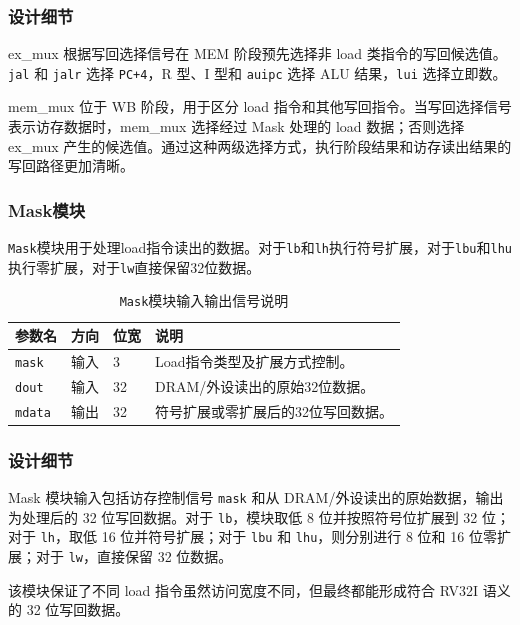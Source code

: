 \documentclass[12pt,a4paper]{ctexart}
\newcommand{\code}[1]{\texttt{#1}}
\begin{document}
\subsubsection*{设计细节}

ex\_mux 根据写回选择信号在 MEM 阶段预先选择非 load 类指令的写回候选值。\code{jal} 和 \code{jalr} 选择 \code{PC+4}，R 型、I 型和 \code{auipc} 选择 ALU 结果，\code{lui} 选择立即数。

mem\_mux 位于 WB 阶段，用于区分 load 指令和其他写回指令。当写回选择信号表示访存数据时，mem\_mux 选择经过 Mask 处理的 load 数据；否则选择 ex\_mux 产生的候选值。通过这种两级选择方式，执行阶段结果和访存读出结果的写回路径更加清晰。

\subsubsection{Mask模块}

\code{Mask}模块用于处理load指令读出的数据。对于\code{lb}和\code{lh}执行符号扩展，对于\code{lbu}和\code{lhu}执行零扩展，对于\code{lw}直接保留32位数据。

\begin{table}[H]
	\centering
	\caption{\code{Mask}模块输入输出信号说明}
	\footnotesize
	\renewcommand{\arraystretch}{1.15}
	\begin{tabularx}{\textwidth}{p{3.2cm}p{1.5cm}p{2.1cm}X}
		\toprule
		参数名          & 方向 & 位宽 & 说明                 \\
		\midrule
		\code{mask}  & 输入 & 3  & Load指令类型及扩展方式控制。   \\
		\code{dout}  & 输入 & 32 & DRAM/外设读出的原始32位数据。 \\
		\code{mdata} & 输出 & 32 & 符号扩展或零扩展后的32位写回数据。 \\
		\bottomrule
	\end{tabularx}
\end{table}

\subsubsection*{设计细节}

Mask 模块输入包括访存控制信号 \code{mask} 和从 DRAM/外设读出的原始数据，输出为处理后的 32 位写回数据。对于 \code{lb}，模块取低 8 位并按照符号位扩展到 32 位；对于 \code{lh}，取低 16 位并符号扩展；对于 \code{lbu} 和 \code{lhu}，则分别进行 8 位和 16 位零扩展；对于 \code{lw}，直接保留 32 位数据。

该模块保证了不同 load 指令虽然访问宽度不同，但最终都能形成符合 RV32I 语义的 32 位写回数据。
\end{document}
